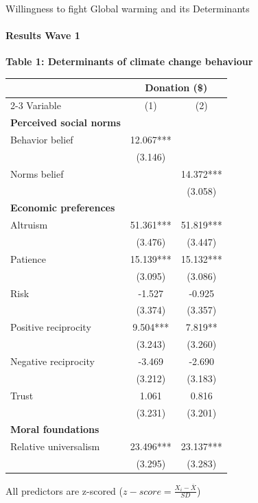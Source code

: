\documentclass{beamer}
\begin{document}
\begin{frame}{Willingness to fight Global warming and its Determinants}
\framesubtitle{Results Wave 1}

    \begin{table}[h]
    \centering
    \scriptsize
    \textbf{Table 1: Determinants of climate change behaviour}\par
    \tiny
    \begin{tabular}{lcc}
    \toprule\toprule
                              & \multicolumn{2}{c}{Donation (\$)} \\
    \cmidrule(lr){2-3}
    Variable                  & (1)        & (2)        \\
    \midrule
    \textbf{Perceived social norms} &       &            \\
    Behavior belief           & 12.067*** &            \\
                              & (3.146)   &            \\
    Norms belief              &           & 14.372***  \\
                              &           & (3.058)    \\
    \addlinespace
    \textbf{Economic preferences} &       &            \\
    Altruism                  & 51.361*** & 51.819***  \\
                              & (3.476)   & (3.447)    \\
    Patience                  & 15.139*** & 15.132***  \\
                              & (3.095)   & (3.086)    \\
    Risk                      & -1.527    & -0.925     \\
                              & (3.374)   & (3.357)    \\
    Positive reciprocity      & 9.504***  & 7.819**    \\
                              & (3.243)   & (3.260)    \\
    Negative reciprocity      & -3.469    & -2.690     \\
                              & (3.212)   & (3.183)    \\
    Trust                     & 1.061     & 0.816      \\
                              & (3.231)   & (3.201)    \\
    \addlinespace
    \textbf{Moral foundations} &          &            \\
    Relative universalism     & 23.496*** & 23.137***  \\
                              & (3.295)   & (3.283)    \\
    \bottomrule\bottomrule
    \end{tabular}
\end{table}

    \tiny
    All predictors are z-scored ($z-score = \frac{X_i - \overline{X}}{SD}$)

\end{frame}
\end{document}
